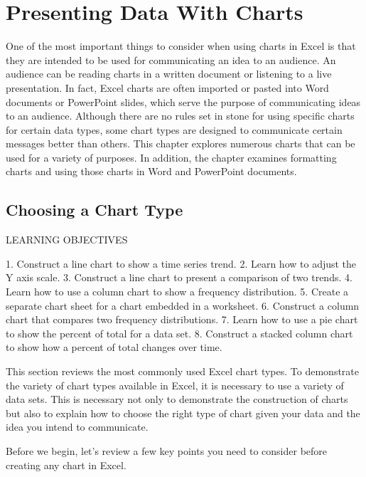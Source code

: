 \chapter{Presenting Data With Charts}\label{ch04:charts}

One of the most important things to consider when using charts in Excel is that they are intended to be used for communicating an idea to an audience. An audience can be reading charts in a written document or listening to a live presentation. In fact, Excel charts are often imported or pasted into Word documents or PowerPoint slides, which serve the purpose of communicating ideas to an audience. Although there are no rules set in stone for using specific charts for certain data types, some chart types are designed to communicate certain messages better than others. This chapter explores numerous charts that can be used for a variety of purposes. In addition, the chapter examines formatting charts and using those charts in Word and PowerPoint documents.

\section{Choosing a Chart Type}

LEARNING OBJECTIVES


1. Construct a line chart to show a time series trend.
2. Learn how to adjust the Y axis scale.
3. Construct a line chart to present a comparison of two trends.
4. Learn how to use a column chart to show a frequency distribution.
5. Create a separate chart sheet for a chart embedded in a worksheet.
6. Construct a column chart that compares two frequency distributions.
7. Learn how to use a pie chart to show the percent of total for a data set.
8. Construct a stacked column chart to show how a percent of total changes over time.



This section reviews the most commonly used Excel chart types. To demonstrate the variety of chart
types available in Excel, it is necessary to use a variety of data sets. This is necessary not only to
demonstrate the construction of charts but also to explain how to choose the right type of chart given
your data and the idea you intend to communicate.

Before we begin, let’s review a few key points you need to consider before creating any chart in Excel.


